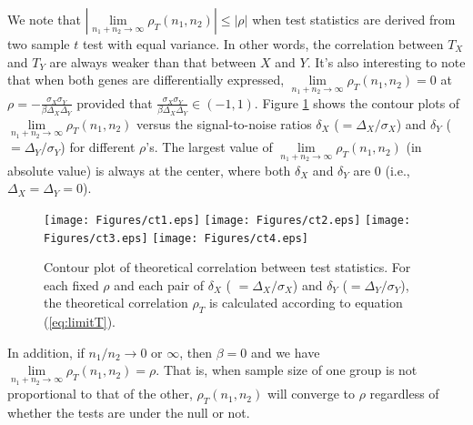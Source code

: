 \documentclass[review]{elsarticle}
\newcommand{\DED}{differentially expressed}
\begin{document}
We note that $|\lim\limits_{n_1 + n_2 \rightarrow \infty} \rho_T(n_1, n_2)| \leq |\rho|$ when test 
statistics are derived from two sample $t$ test 
with equal variance. In other words, the correlation between $T_X$ and $T_Y$ are always weaker
than that between $X$ 
and $Y$. It's also interesting to note that when both genes are \DED, $\lim\limits_{n_1 + n_2 
	\rightarrow \infty} \rho_T(n_1, n_2)=0$ at $\rho 
=-\frac{\sigma_X\sigma_Y}{\beta\Delta_X\Delta_Y} $ provided that
$\frac{\sigma_X\sigma_Y}{\beta\Delta_X\Delta_Y} \in (-1, 1)$. Figure \ref{fig:ct} shows the 
contour plots of $\lim\limits_{n_1 + n_2 \rightarrow \infty} \rho_T(n_1, n_2)$ versus the 
signal-to-noise ratios $\delta_X$ ($=\Delta_X/\sigma_X$) 
and $\delta_Y$ ($=\Delta_Y/\sigma_Y$) for different $\rho$'s. The largest value of 
$\lim\limits_{n_1 + n_2 \rightarrow \infty} \rho_T(n_1, n_2)$ (in 
absolute value) 
is always at the center, where both $\delta_X$ and $\delta_Y$ are 0 (i.e., $\Delta_X =\Delta_Y 
= 0$).

\begin{figure}[!ht]
	\centering
	\texttt{[image: Figures/ct1.eps]}
	\texttt{[image: Figures/ct2.eps]}
	\texttt{[image: Figures/ct3.eps]}
	\texttt{[image: Figures/ct4.eps]}
	\caption[Contour plot of theoretical correlation between test statistics.]{Contour plot of 
		theoretical correlation between test statistics. For 
		each fixed $\rho$ and each pair of $\delta_X$ (	$=\Delta_X/\sigma_X$) 
		and $\delta_Y$ ($=\Delta_Y/\sigma_Y$), the theoretical correlation $\rho_T$ is 
		calculated according to equation (\ref{eq:limitT}).}
	\label{fig:ct}
\end{figure}

In addition, if $n_1/n_2\rightarrow 0$ or $\infty$, then $\beta = 0$ and we have 
$\lim\limits_{n_1+n_2\rightarrow\infty}\rho_T(n_1, n_2) =\rho$. That is, when sample size of one 
group is not 
proportional to that of the other, 
$\rho_T(n_1, n_2)$ will converge to $\rho$ regardless of whether the tests are under the null or 
not. 	
\end{document}
